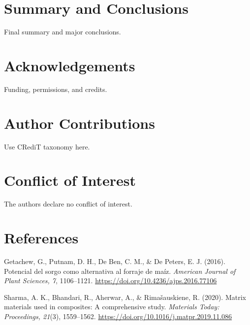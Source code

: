 \documentclass[12pt,a4paper]{article}
\begin{document}
\section{Summary and Conclusions}
Final summary and major conclusions.

\section{Acknowledgements}
Funding, permissions, and credits.

\section{Author Contributions}
Use CRediT taxonomy here.

\section{Conflict of Interest}
The authors declare no conflict of interest.

\section{References}
\begin{enumerate}[label={[{\arabic*}]}]
  \item Getachew, G., Putnam, D. H., De Ben, C. M., \& De Peters, E. J. (2016). Potencial del sorgo como alternativa al forraje de maíz. \textit{American Journal of Plant Sciences, 7}, 1106–1121. \url{https://doi.org/10.4236/ajps.2016.77106}
  \item Sharma, A. K., Bhandari, R., Aherwar, A., \& Rimašauskiene, R. (2020). Matrix materials used in composites: A comprehensive study. \textit{Materials Today: Proceedings, 21}(3), 1559–1562. \url{https://doi.org/10.1016/j.matpr.2019.11.086}
\end{enumerate}
\end{document}
